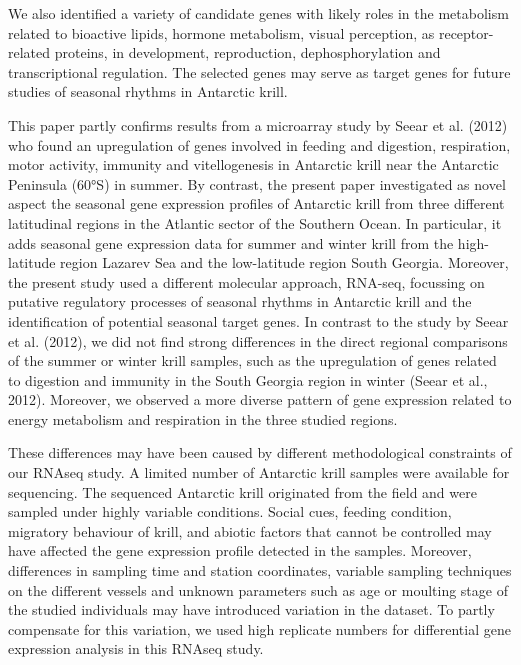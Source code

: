 We also identified a variety of candidate genes with likely roles in the metabolism related to bioactive lipids, hormone metabolism, visual perception, as receptor-related proteins, in development, reproduction, dephosphorylation and transcriptional regulation. The selected genes may serve as target genes for future studies of seasonal rhythms in Antarctic krill.

This paper partly confirms results from a microarray study by Seear et al. (2012) who found an upregulation of genes involved in feeding and digestion, respiration, motor activity, immunity and vitellogenesis in Antarctic krill near the Antarctic Peninsula (60°S) in summer. By contrast, the present paper investigated as novel aspect the seasonal gene expression profiles of Antarctic krill from three different latitudinal regions in the Atlantic sector of the Southern Ocean. In particular, it adds seasonal gene expression data for summer and winter krill from the high-latitude region Lazarev Sea and the low-latitude region South Georgia. Moreover, the present study used a different molecular approach, RNA-seq, focussing on putative regulatory processes of seasonal rhythms in Antarctic krill and the identification of potential seasonal target genes. In contrast to the study by Seear et al. (2012), we did not find strong differences in the direct regional comparisons of the summer or winter krill samples, such as the upregulation of genes related to digestion and immunity in the South Georgia region in winter (Seear et al., 2012). Moreover, we observed a more diverse pattern of gene expression related to energy metabolism and respiration in the three studied regions.

These differences may have been caused by different methodological constraints of our RNAseq study. A limited number of Antarctic krill samples were available for sequencing. The sequenced Antarctic krill originated from the field and were sampled under highly variable conditions. Social cues, feeding condition, migratory behaviour of krill, and abiotic factors that cannot be controlled may have affected the gene expression profile detected in the samples. Moreover, differences in sampling time and station coordinates, variable sampling techniques on the different vessels and unknown parameters such as age or moulting stage of the studied individuals may have introduced variation in the dataset. To partly compensate for this variation, we used high replicate numbers for differential gene expression analysis in this RNAseq study.


